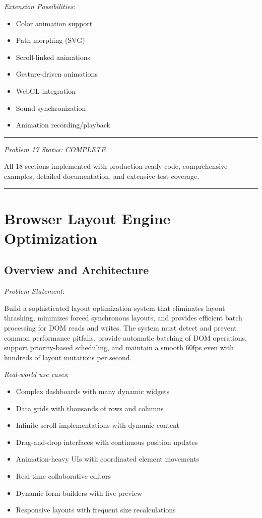 \documentclass[11pt]{article}
\begin{document}
\emph{Extension Possibilities}:

\begin{itemize}
\item Color animation support
\item Path morphing (SVG)
\item Scroll-linked animations
\item Gesture-driven animations
\item WebGL integration
\item Sound synchronization
\item Animation recording/playback
\end{itemize}

\noindent\rule{\textwidth}{0.5pt}

\emph{Problem 17 Status: COMPLETE}

All 18 sections implemented with production-ready code, comprehensive examples, detailed documentation, and extensive test coverage.

\noindent\rule{\textwidth}{0.5pt}
\section{Browser Layout Engine Optimization}
\label{sec:org72d5a91}

\subsection{Overview and Architecture}
\label{sec:orgbca7af5}

\emph{Problem Statement}:

Build a sophisticated layout optimization system that eliminates layout thrashing, minimizes forced synchronous layouts, and provides efficient batch processing for DOM reads and writes. The system must detect and prevent common performance pitfalls, provide automatic batching of DOM operations, support priority-based scheduling, and maintain a smooth 60fps even with hundreds of layout mutations per second.

\emph{Real-world use cases}:

\begin{itemize}
\item Complex dashboards with many dynamic widgets
\item Data grids with thousands of rows and columns
\item Infinite scroll implementations with dynamic content
\item Drag-and-drop interfaces with continuous position updates
\item Animation-heavy UIs with coordinated element movements
\item Real-time collaborative editors
\item Dynamic form builders with live preview
\item Responsive layouts with frequent size recalculations
\end{itemize}
\end{document}
